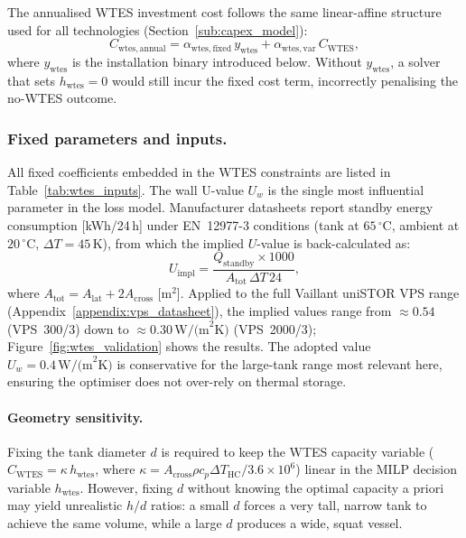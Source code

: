 \documentclass[11pt,a4paper]{report}
\begin{document}
The annualised WTES investment cost follows the same linear-affine structure used
for all technologies (Section~\ref{sub:capex_model}):
\begin{equation}
    C_\mathrm{wtes,annual}
        = \alpha_\mathrm{wtes,fixed}\,y_\mathrm{wtes}
        + \alpha_\mathrm{wtes,var}\,C_\mathrm{WTES},
    \label{eq:wtes_capex_annual}
\end{equation}
where $y_\mathrm{wtes}$ is the installation binary introduced below.
Without $y_\mathrm{wtes}$, a solver that sets $h_\mathrm{wtes} = 0$ would still
incur the fixed cost term, incorrectly penalising the no-WTES outcome.

\subsubsection{Fixed parameters and inputs.}
\label{par:wtes_uval}

All fixed coefficients embedded in the WTES constraints are listed in
Table~\ref{tab:wtes_inputs}.
The wall U-value $U_w$ is the single most influential parameter in the loss model.
Manufacturer datasheets report standby energy consumption [kWh/24\,h] under
EN~12977-3 conditions (tank at $65\,^{\circ}\mathrm{C}$, ambient at
$20\,^{\circ}\mathrm{C}$, $\Delta T = 45\,\mathrm{K}$), from which the implied
$U$-value is back-calculated as:
\begin{equation}
    U_\mathrm{impl} = \frac{Q_\mathrm{standby} \times 1000}{A_\mathrm{tot}\,\Delta T\,24},
    \label{eq:uimpl}
\end{equation}
where $A_\mathrm{tot} = A_\mathrm{lat} + 2A_\mathrm{cross}$ [m$^2$].
Applied to the full Vaillant uniSTOR VPS range
(Appendix~\ref{appendix:vps_datasheet}), the implied values range from
$\approx 0.54$ (VPS~300/3) down to $\approx 0.30\,\text{W/(m}^2\text{K)}$
(VPS~2000/3); Figure~\ref{fig:wtes_validation} shows the results.
The adopted value $U_w = 0.4\,\text{W/(m}^2\text{K)}$ is conservative for the
large-tank range most relevant here, ensuring the optimiser does not over-rely
on thermal storage.

\paragraph{Geometry sensitivity.}
Fixing the tank diameter $d$ is required to keep the WTES capacity variable
($C_\mathrm{WTES} = \kappa\,h_\mathrm{wtes}$, where $\kappa = A_\mathrm{cross}\rho c_p \Delta T_\mathrm{HC}/3.6{\times}10^6$)
linear in the MILP decision variable $h_\mathrm{wtes}$.
However, fixing $d$ without knowing the optimal capacity a priori may yield
unrealistic $h/d$ ratios: a small $d$ forces a very tall, narrow tank to achieve
the same volume, while a large $d$ produces a wide, squat vessel.
\end{document}
